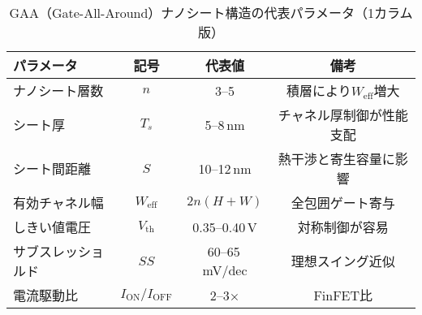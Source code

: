 \begin{table}[t]
  \centering
  \caption{GAA（Gate-All-Around）ナノシート構造の代表パラメータ（1カラム版）}
  \label{tab:gaa_params}
  \setlength{\tabcolsep}{2.2pt}     %
  \renewcommand{\arraystretch}{1.05} %
  \footnotesize                     %
  \begin{tabular}{lccc}
    \toprule
    パラメータ & 記号 & 代表値 & 備考 \\
    \midrule
    ナノシート層数 & $n$ & 3--5 & 積層により$W_\mathrm{eff}$増大 \\
    シート厚 & $T_s$ & 5--8\,nm & チャネル厚制御が性能支配 \\
    シート間距離 & $S$ & 10--12\,nm & 熱干渉と寄生容量に影響 \\
    有効チャネル幅 & $W_\mathrm{eff}$ & $2n(H+W)$ & 全包囲ゲート寄与 \\
    しきい値電圧 & $V_\mathrm{th}$ & 0.35--0.40\,V & 対称制御が容易 \\
    サブスレッショルド & $SS$ & 60--65\,mV/dec & 理想スイング近似 \\
    電流駆動比 & $I_\mathrm{ON}/I_\mathrm{OFF}$ & 2--3× & FinFET比 \\
    \bottomrule
  \end{tabular}
\end{table}
